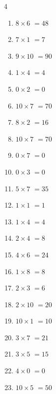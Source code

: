 \begin{multicols}{4}
\begin{enumerate}
\columnbreak %

  \item $8\times 6$
        $=48$

  \item $7\times 1$
        $=7$

  \item $9\times 10$
        $=90$

  \item $1\times 4$
        $=4$

  \item $0\times 2$
        $=0$

  \item $10\times 7$
        $=70$

  \item $8\times 2$
        $=16$

  \item $10\times 7$
        $=70$

  \item $0\times 7$
        $=0$

  \item $0\times 3$
        $=0$

  \item $5\times 7$
        $=35$

  \item $1\times 1$
        $=1$

  \item $1\times 4$
        $=4$

  \item $2\times 4$
        $=8$

  \item $4\times 6$
        $=24$

  \item $1\times 8$
        $=8$

  \item $2\times 3$
        $=6$

  \item $2\times 10$
        $=20$

  \item $10\times 1$
        $=10$

  \item $3\times 7$
        $=21$

  \item $3\times 5$
        $=15$

  \item $4\times 0$
        $=0$

  \item $10\times 5$
        $=50$


\end{enumerate}
\end{multicols}

